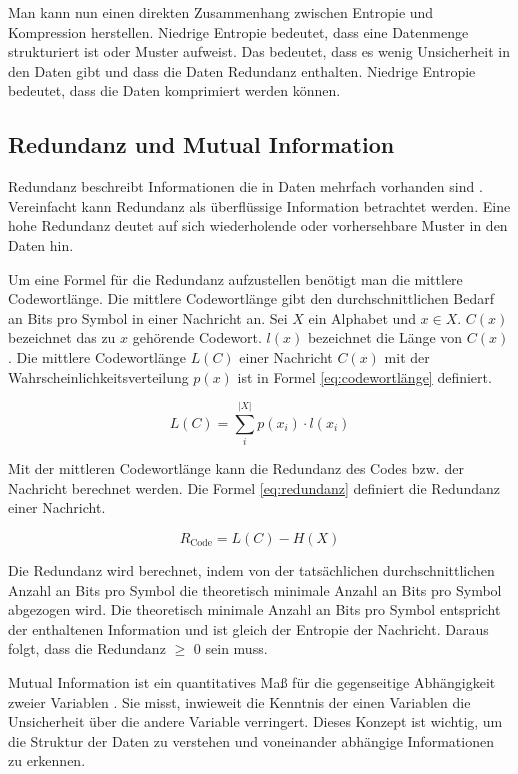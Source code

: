 \documentclass[conference]{IEEEtran}
\begin{document}
Man kann nun einen direkten Zusammenhang zwischen Entropie und Kompression herstellen. 
Niedrige Entropie bedeutet, dass eine Datenmenge strukturiert ist oder Muster aufweist. 
Das bedeutet, dass es wenig Unsicherheit in den Daten gibt und dass die Daten Redundanz 
enthalten. Niedrige Entropie bedeutet, dass die Daten komprimiert werden können.


\subsection{Redundanz und Mutual Information}

Redundanz beschreibt Informationen die in Daten mehrfach vorhanden sind \cite{friedrichs}. 
Vereinfacht kann Redundanz als überflüssige Information betrachtet werden.
Eine hohe Redundanz deutet auf sich wiederholende oder vorhersehbare Muster in den Daten hin.

Um eine Formel für die Redundanz aufzustellen benötigt man die mittlere Codewortlänge.
Die mittlere Codewortlänge gibt den durchschnittlichen Bedarf an Bits pro Symbol in einer
Nachricht an.
Sei $X$ ein Alphabet und $x \in X$.
$C(x)$ bezeichnet das zu $x$ gehörende Codewort.
$l(x)$ bezeichnet die Länge von $C(x)$.
Die mittlere Codewortlänge $L(C)$ einer Nachricht $C(x)$ mit der Wahrscheinlichkeitsverteilung
$p(x)$ ist in Formel \ref{eq:codewortlänge} definiert.

\begin{equation}
  \label{eq:codewortlänge}
  L(C) = \sum_{i}^{|X|} p(x_i) \cdot l(x_i)
\end{equation}

Mit der mittleren Codewortlänge kann die Redundanz des Codes bzw. der Nachricht berechnet 
werden.
Die Formel \ref{eq:redundanz} definiert die Redundanz einer Nachricht.

\begin{equation}
  \label{eq:redundanz}
  R_{\text{Code}} = L(C) - H(X)
\end{equation}

Die Redundanz wird berechnet, indem von der tatsächlichen durchschnittlichen
Anzahl an Bits pro Symbol die theoretisch minimale Anzahl an Bits pro Symbol
abgezogen wird.
Die theoretisch minimale Anzahl an Bits pro Symbol entspricht der enthaltenen
Information und ist gleich der Entropie der Nachricht.
Daraus folgt, dass die Redundanz $\geq$ 0 sein muss.

Mutual Information ist ein quantitatives Maß für die gegenseitige Abhängigkeit zweier
Variablen \cite{shannon}. 
Sie misst, inwieweit die Kenntnis der einen Variablen die Unsicherheit über die 
andere Variable verringert.
Dieses Konzept ist wichtig, um die Struktur der Daten zu verstehen und voneinander 
abhängige Informationen zu erkennen. 
\end{document}
